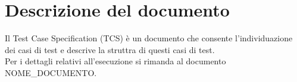 \chapter{Descrizione del documento}
Il Test Case Specification (TCS) è un documento che consente l’individuazione dei casi di test e descrive  la struttra di questi casi di test. \\
Per i dettagli relativi all’esecuzione si rimanda al documento NOME\_DOCUMENTO.

